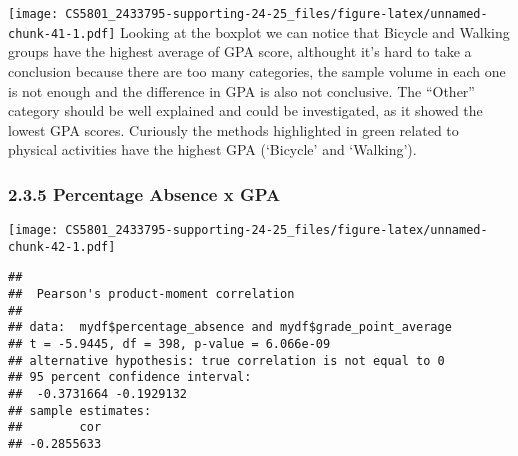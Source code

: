 \documentclass[
]{article}
\newenvironment{Shaded}{\begin{snugshade}}{\end{snugshade}}
\newcommand{\AttributeTok}[1]{\textcolor[rgb]{0.13,0.29,0.53}{#1}}
\newcommand{\CommentTok}[1]{\textcolor[rgb]{0.56,0.35,0.01}{\textit{#1}}}
\newcommand{\DecValTok}[1]{\textcolor[rgb]{0.00,0.00,0.81}{#1}}
\newcommand{\FunctionTok}[1]{\textcolor[rgb]{0.13,0.29,0.53}{\textbf{#1}}}
\newcommand{\NormalTok}[1]{#1}
\newcommand{\SpecialCharTok}[1]{\textcolor[rgb]{0.81,0.36,0.00}{\textbf{#1}}}
\newcommand{\StringTok}[1]{\textcolor[rgb]{0.31,0.60,0.02}{#1}}
\begin{document}
\texttt{[image: CS5801\_2433795-supporting-24-25\_files/figure-latex/unnamed-chunk-41-1.pdf]}
Looking at the boxplot we can notice that Bicycle and Walking groups
have the highest average of GPA score, althought it's hard to take a
conclusion because there are too many categories, the sample volume in
each one is not enough and the difference in GPA is also not conclusive.
The ``Other'' category should be well explained and could be
investigated, as it showed the lowest GPA scores. Curiously the methods
highlighted in green related to physical activities have the highest GPA
(`Bicycle' and `Walking').

\subsubsection{2.3.5 Percentage Absence x
GPA}\label{percentage-absence-x-gpa}

\begin{Shaded}
\end{Shaded}

\texttt{[image: CS5801\_2433795-supporting-24-25\_files/figure-latex/unnamed-chunk-42-1.pdf]}

\begin{Shaded}
\end{Shaded}

\begin{verbatim}
## 
##  Pearson's product-moment correlation
## 
## data:  mydf$percentage_absence and mydf$grade_point_average
## t = -5.9445, df = 398, p-value = 6.066e-09
## alternative hypothesis: true correlation is not equal to 0
## 95 percent confidence interval:
##  -0.3731664 -0.1929132
## sample estimates:
##        cor 
## -0.2855633
\end{verbatim}
\end{document}
